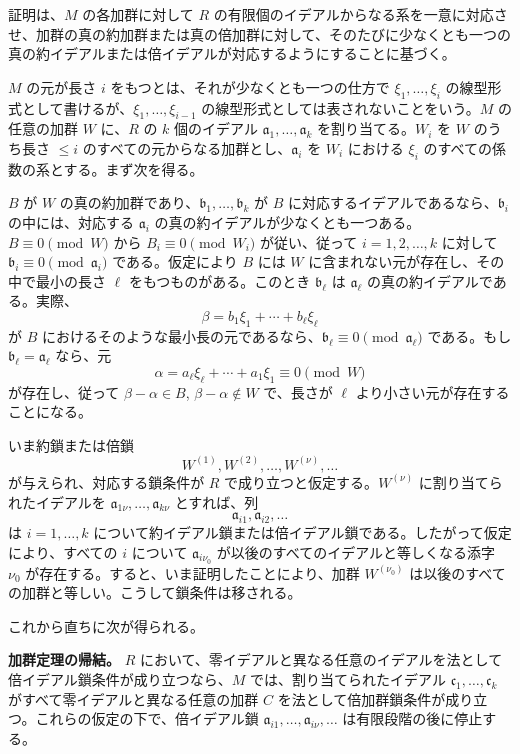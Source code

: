 \documentclass[11pt]{article}
\begin{document}
証明は、$M$ の各加群に対して $R$ の有限個のイデアルからなる系を一意に対応させ、加群の真の約加群または真の倍加群に対して、そのたびに少なくとも一つの真の約イデアルまたは倍イデアルが対応するようにすることに基づく。

$M$ の元が長さ $i$ をもつとは、それが少なくとも一つの仕方で $\xi_1,\ldots,\xi_i$ の線型形式として書けるが、$\xi_1,\ldots,\xi_{i-1}$ の線型形式としては表されないことをいう。$M$ の任意の加群 $W$ に、$R$ の $k$ 個のイデアル $\mathfrak a_1,\ldots,\mathfrak a_k$ を割り当てる。$W_i$ を $W$ のうち長さ $\le i$ のすべての元からなる加群とし、$\mathfrak a_i$ を $W_i$ における $\xi_i$ のすべての係数の系とする。まず次を得る。

$B$ が $W$ の真の約加群であり、$\mathfrak b_1,\ldots,\mathfrak b_k$ が $B$ に対応するイデアルであるなら、$\mathfrak b_i$ の中には、対応する $\mathfrak a_i$ の真の約イデアルが少なくとも一つある。$B\equiv0\pmod W$ から $B_i\equiv0\pmod {W_i}$ が従い、従って $i=1,2,\ldots,k$ に対して $\mathfrak b_i\equiv0\pmod{\mathfrak a_i}$ である。仮定により $B$ には $W$ に含まれない元が存在し、その中で最小の長さ $\ell$ をもつものがある。このとき $\mathfrak b_\ell$ は $\mathfrak a_\ell$ の真の約イデアルである。実際、
\[
        \beta=b_1\xi_1+\cdots+b_\ell\xi_\ell
\]
が $B$ におけるそのような最小長の元であるなら、$\mathfrak b_\ell\equiv0\pmod{\mathfrak a_\ell}$ である。もし $\mathfrak b_\ell=\mathfrak a_\ell$ なら、元
\[
        \alpha=a_\ell\xi_\ell+\cdots+a_1\xi_1\equiv0\pmod W
\]
が存在し、従って $\beta-\alpha\in B$, $\beta-\alpha\notin W$ で、長さが $\ell$ より小さい元が存在することになる。

いま約鎖または倍鎖
\[
        W^{(1)},W^{(2)},\ldots,W^{(\nu)},\ldots
\]
が与えられ、対応する鎖条件が $R$ で成り立つと仮定する。$W^{(\nu)}$ に割り当てられたイデアルを $\mathfrak a_{1\nu},\ldots,\mathfrak a_{k\nu}$ とすれば、列
\[
        \mathfrak a_{i1},\mathfrak a_{i2},\ldots
\]
は $i=1,\ldots,k$ について約イデアル鎖または倍イデアル鎖である。したがって仮定により、すべての $i$ について $\mathfrak a_{i\nu_0}$ が以後のすべてのイデアルと等しくなる添字 $\nu_0$ が存在する。すると、いま証明したことにより、加群 $W^{(\nu_0)}$ は以後のすべての加群と等しい。こうして鎖条件は移される。

これから直ちに次が得られる。

\medskip
\noindent\textbf{加群定理の帰結。} $R$ において、零イデアルと異なる任意のイデアルを法として倍イデアル鎖条件が成り立つなら、$M$ では、割り当てられたイデアル $\mathfrak c_1,\ldots,\mathfrak c_k$ がすべて零イデアルと異なる任意の加群 $C$ を法として倍加群鎖条件が成り立つ。これらの仮定の下で、倍イデアル鎖 $\mathfrak a_{i1},\ldots,\mathfrak a_{i\nu},\ldots$ は有限段階の後に停止する。
\end{document}
